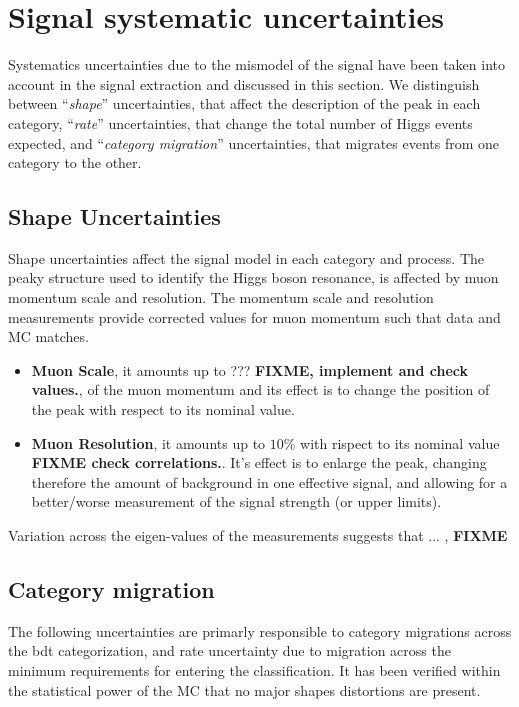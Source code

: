 \section{Signal systematic uncertainties}
\label{sig_syst}
Systematics uncertainties due to the mismodel of the signal have been taken into account in the signal extraction and discussed in this section.
We distinguish between ``{\it shape}'' uncertainties, that affect the description of the peak in each category, ``{\it rate}'' uncertainties,
that change the total number of Higgs events expected, and ``{\it category migration}'' uncertainties, that migrates events from one category to the other.

\subsection{Shape Uncertainties}
Shape uncertainties affect the signal model in each category and process.
The peaky structure used to identify the Higgs boson resonance, is affected by muon momentum scale and resolution.
The momentum scale and resolution measurements provide corrected values for muon momentum such that data and MC matches.

\begin{itemize}
    \item {\bf Muon Scale}, it amounts up to ??? %
{\bf FIXME, implement and check values.}, of the muon momentum and its effect is to change the position of the peak with respect to its nominal value.
    \item {\bf Muon Resolution}, it amounts up to $10\%$ with rispect to its nominal value {\bf FIXME check correlations.}.
        It's effect is to enlarge the peak, changing therefore the amount of background in one effective signal, and allowing for a better/worse measurement of the signal strength (or upper limits).
\end{itemize}

Variation across the eigen-values of the measurements suggests that ... , {\bf FIXME}

\subsection{Category migration}
The following uncertainties are primarly responsible to category migrations across the bdt categorization, and rate uncertainty due to migration across the minimum requirements for entering the classification. It has been verified within the statistical power of the MC
that no major shapes distortions are present.

